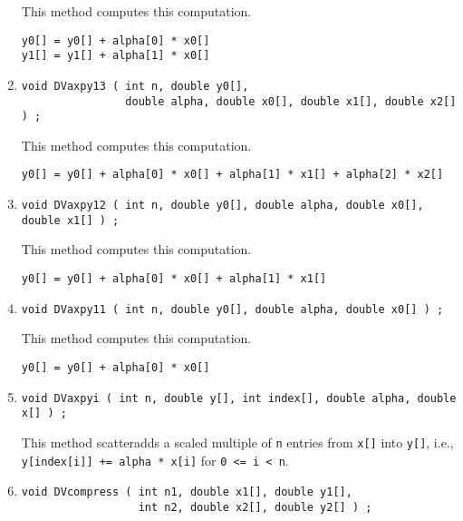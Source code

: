 \begin{enumerate}
This method computes this computation.
\begin{verbatim}
y0[] = y0[] + alpha[0] * x0[] 
y1[] = y1[] + alpha[1] * x0[] 
\end{verbatim}
\item
\begin{verbatim}
void DVaxpy13 ( int n, double y0[], 
                double alpha, double x0[], double x1[], double x2[] ) ;
\end{verbatim}
This method computes this computation.
\begin{verbatim}
y0[] = y0[] + alpha[0] * x0[] + alpha[1] * x1[] + alpha[2] * x2[]
\end{verbatim}
\item
\begin{verbatim}
void DVaxpy12 ( int n, double y0[], double alpha, double x0[], double x1[] ) ;
\end{verbatim}
This method computes this computation.
\begin{verbatim}
y0[] = y0[] + alpha[0] * x0[] + alpha[1] * x1[] 
\end{verbatim}
\item
\begin{verbatim}
void DVaxpy11 ( int n, double y0[], double alpha, double x0[] ) ;
\end{verbatim}
This method computes this computation.
\begin{verbatim}
y0[] = y0[] + alpha[0] * x0[] 
\end{verbatim}
\item
\begin{verbatim}
void DVaxpyi ( int n, double y[], int index[], double alpha, double x[] ) ;
\end{verbatim}
This method scatteradds 
a scaled multiple of {\tt n} entries from {\tt x[]} 
into {\tt y[]},
i.e.,
{\tt y[index[i]] += alpha * x[i]} for {\tt 0 <= i < n}.
\item
\begin{verbatim}
void DVcompress ( int n1, double x1[], double y1[],
                  int n2, double x2[], double y2[] ) ;

\end{verbatim}
\end{enumerate}

